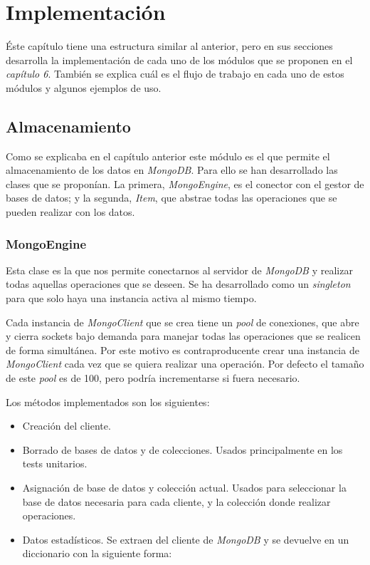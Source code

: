 \chapter{Implementación}

Éste capítulo tiene una estructura similar al anterior, pero en sus secciones desarrolla la implementación de cada uno de los módulos que se proponen en el \textit{capítulo 6}. También se explica cuál es el flujo de trabajo en cada uno de estos módulos y algunos ejemplos de uso.


\section{Almacenamiento}

Como se explicaba en el capítulo anterior este módulo es el que permite el almacenamiento de los datos en \textit{MongoDB}. Para ello se han desarrollado las clases que se proponían. La primera, \textit{MongoEngine}, es el conector con el gestor de bases de datos; y la segunda, \textit{Item}, que abstrae todas las operaciones que se pueden realizar con los datos.

\subsection{MongoEngine}
\label{sec:mongoengine}

Esta clase es la que nos permite conectarnos al servidor de \textit{MongoDB} y realizar todas aquellas operaciones que se deseen. Se ha desarrollado como un \textit{singleton} para que solo haya una instancia activa al mismo tiempo.

Cada instancia de \textit{MongoClient} que se crea tiene un \textit{pool} de conexiones, que abre y cierra sockets bajo demanda para manejar todas las operaciones que se realicen de forma simultánea. Por este motivo es contraproducente crear una instancia de \textit{MongoClient} cada vez que se quiera realizar una operación. Por defecto el tamaño de este \textit{pool} es de 100, pero podría incrementarse si fuera necesario.

\bigskip
Los métodos implementados son los siguientes:
\begin{itemize}
	\item Creación del cliente.
	\item Borrado de bases de datos y de colecciones. Usados principalmente en los tests unitarios.
	\item Asignación de base de datos y colección actual. Usados para seleccionar la base de datos necesaria para cada cliente, y la colección donde realizar operaciones.
	\item Datos estadísticos. Se extraen del cliente de \textit{MongoDB} y se devuelve en un diccionario con la siguiente forma:
\end{itemize}

